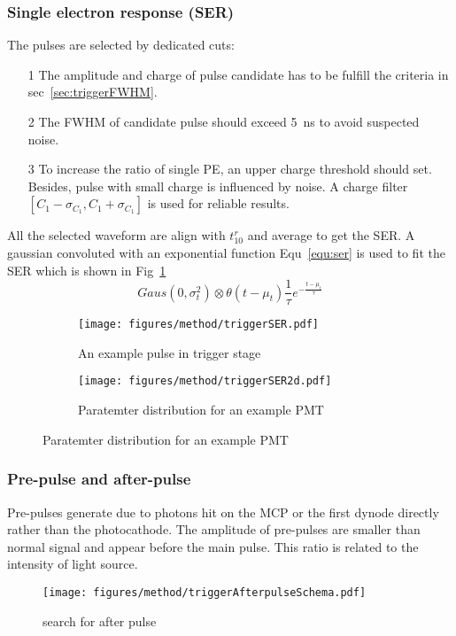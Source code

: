 \subsubsection{Single electron response (SER)}
The pulses are selected by dedicated cuts:
\begin{itemize}
    \item[1] The amplitude and charge of pulse candidate has to be fulfill the criteria in sec~\ref{sec:triggerFWHM}.
    \item[2] The FWHM of candidate pulse should exceed \SI{5}{ns} to avoid suspected noise.
    \item[3] To increase the ratio of single PE, an upper charge threshold should set. Besides, pulse with small charge is influenced by noise. A charge filter $[C_1-\sigma_{C_1},C_1+\sigma_{C_1}]$ is used for reliable results.
\end{itemize}
All the selected waveform are align with $t_{10}^r$ and average to get the SER. A gaussian convoluted with an exponential function Equ~\eqref{equ:ser} is used to fit the SER which is shown in Fig~\ref{fig:triggerser}
\begin{equation}
    \label{equ:ser}
    Gaus(0,\sigma_t^2)\otimes\theta(t-\mu_t)\frac{1}{\tau}e^{-\frac{t-\mu_t}{\tau}}
\end{equation}

\begin{figure}
    \centering
    \begin{subfigure}[t]{0.47\textwidth}
        \texttt{[image: figures/method/triggerSER.pdf]}
        \caption{An example pulse in trigger stage}
        \label{fig:triggerser}
    \end{subfigure}
    \begin{subfigure}[t]{0.47\textwidth}
        \texttt{[image: figures/method/triggerSER2d.pdf]}
        \caption{Paratemter distribution  for an example PMT}
        \label{fig:triggerser2d}
    \end{subfigure}
\end{figure}
\subsubsection{Pre-pulse and after-pulse}
Pre-pulses generate due to photons hit on the MCP or the first dynode directly rather than the photocathode\cite{JUNOMassTesting}. The amplitude of pre-pulses are smaller than normal signal and appear before the main pulse. This ratio is related to the intensity of light source.
\begin{figure}
    \centering
    \texttt{[image: figures/method/triggerAfterpulseSchema.pdf]}
    \caption{search for after pulse}
    \label{fig:afterpulseSchema}
\end{figure}

